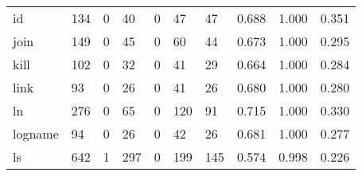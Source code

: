 \begin{longtable}{lp{2.0cm}p{2.0cm}p{2.0cm}p{2.0cm}p{2.0cm}p{2.0cm}p{2.0cm}p{2.0cm}p{2.0cm}}
id        &                    134 &                                  0 &                                40 &                                0 &                                47 &                              47 &                                0.688 &                                  1.000 &                                0.351 \\
join      &                    149 &                                  0 &                                45 &                                0 &                                60 &                              44 &                                0.673 &                                  1.000 &                                0.295 \\
kill      &                    102 &                                  0 &                                32 &                                0 &                                41 &                              29 &                                0.664 &                                  1.000 &                                0.284 \\
link      &                     93 &                                  0 &                                26 &                                0 &                                41 &                              26 &                                0.680 &                                  1.000 &                                0.280 \\
ln        &                    276 &                                  0 &                                65 &                                0 &                               120 &                              91 &                                0.715 &                                  1.000 &                                0.330 \\
logname   &                     94 &                                  0 &                                26 &                                0 &                                42 &                              26 &                                0.681 &                                  1.000 &                                0.277 \\
ls        &                    642 &                                  1 &                               297 &                                0 &                               199 &                             145 &                                0.574 &                                  0.998 &                                0.226 \\

\end{longtable}
